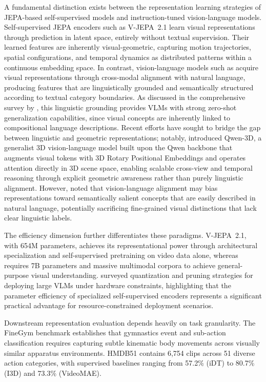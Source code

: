 A fundamental distinction exists between the representation learning strategies of JEPA-based self-supervised models and instruction-tuned vision-language models. Self-supervised JEPA encoders such as V-JEPA~2.1 \citep{murlabadia2026vjepa21} learn visual representations through prediction in latent space, entirely without textual supervision. Their learned features are inherently visual-geometric, capturing motion trajectories, spatial configurations, and temporal dynamics as distributed patterns within a continuous embedding space. In contrast, vision-language models such as \qwenvl{} \citep{bai2025qwen2vl, qwen2025qwen3vl} acquire visual representations through cross-modal alignment with natural language, producing features that are linguistically grounded and semantically structured according to textual category boundaries. As discussed in the comprehensive survey by \citet{bordes2024vlm}, this linguistic grounding provides VLMs with strong zero-shot generalization capabilities, since visual concepts are inherently linked to compositional language descriptions. Recent efforts have sought to bridge the gap between linguistic and geometric representations; notably, \citet{lin2026qwen3d} introduced Qwen-3D, a generalist 3D vision-language model built upon the Qwen backbone that augments visual tokens with 3D Rotary Positional Embeddings and operates attention directly in 3D scene space, enabling scalable cross-view and temporal reasoning through explicit geometric awareness rather than purely linguistic alignment. However, \citet{zhang2023vlmsurvey} noted that vision-language alignment may bias representations toward semantically salient concepts that are easily described in natural language, potentially sacrificing fine-grained visual distinctions that lack clear linguistic labels.

The efficiency dimension further differentiates these paradigms. V-JEPA~2.1, with 654M parameters, achieves its representational power through architectural specialization and self-supervised pretraining on video data alone, whereas \qwenvl{} requires 7B parameters and massive multimodal corpora to achieve general-purpose visual understanding. \citet{pathak2026efficientvlms} surveyed quantization and pruning strategies for deploying large VLMs under hardware constraints, highlighting that the parameter efficiency of specialized self-supervised encoders represents a significant practical advantage for resource-constrained deployment scenarios.

Downstream representation evaluation depends heavily on task granularity. The FineGym benchmark establishes that gymnastics event and sub-action classification requires capturing subtle kinematic body movements across visually similar apparatus environments. HMDB51 contains 6,754 clips across 51 diverse action categories, with supervised baselines ranging from 57.2\% (iDT) to 80.7\% (I3D) and 73.3\% (VideoMAE).

